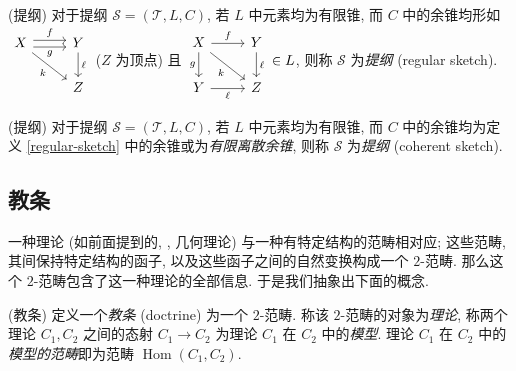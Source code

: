 \begin{definition}
	[label={regular-sketch}]
	{(\regular{}提纲)}
	对于提纲 $\mathscr S=(\mathcal T,L,C)$, 若 $L$ 中元素均为有限锥, 而 $C$ 中的余锥均形如
	$\begin{tikzcd}[ampersand replacement=\&]
		X \& Y \\
		\& Z
		\arrow["f", shift left, from=1-1, to=1-2]
		\arrow["g"', shift right, from=1-1, to=1-2]
		\arrow["k"', from=1-1, to=2-2]
		\arrow["\ell", from=1-2, to=2-2]
	\end{tikzcd}$
	($Z$ 为顶点) 且
	$\begin{tikzcd}[ampersand replacement=\&]
		X \& Y \\
		Y \& Z
		\arrow["f", from=1-1, to=1-2]
		\arrow["g"', from=1-1, to=2-1]
		\arrow["k"', from=1-1, to=2-2]
		\arrow["\ell", from=1-2, to=2-2]
		\arrow["\ell"', from=2-1, to=2-2]
	\end{tikzcd}\in L$,
	则称 $\mathscr S$ 为\emph{\regular{}提纲} (regular sketch).
\end{definition}

\begin{definition}
	{(\coherent{}提纲)}
	对于提纲 $\mathscr S=(\mathcal T,L,C)$, 若 $L$ 中元素均为有限锥, 而 $C$ 中的余锥均为定义 \ref{regular-sketch} 中的余锥或为\emph{有限离散余锥}, 则称 $\mathscr S$ 为\emph{\coherent{}提纲} (coherent sketch).
\end{definition}

\subsection{教条}

一种理论 (如前面提到的\regular{}, \coherent{}, 几何理论) 与一种有特定结构的范畴相对应; 这些范畴, 其间保持特定结构的函子, 以及这些函子之间的自然变换构成一个 $2$-范畴. 那么这个 $2$-范畴包含了这一种理论的全部信息. 于是我们抽象出下面的概念.

\begin{definition}
	{(教条)}
	定义一个\emph{教条}\footnotemark{} (doctrine) 为一个 $2$-范畴. 称该 $2$-范畴的对象为\emph{理论}, 称两个理论 $C_1,C_2$ 之间的态射 $C_1\to C_2$ 为理论 $C_1$ 在 $C_2$ 中的\emph{模型}. 理论 $C_1$ 在 $C_2$ 中的\emph{模型的范畴}即为范畴 $\operatorname{Hom}(C_1,C_2)$.
\end{definition}

